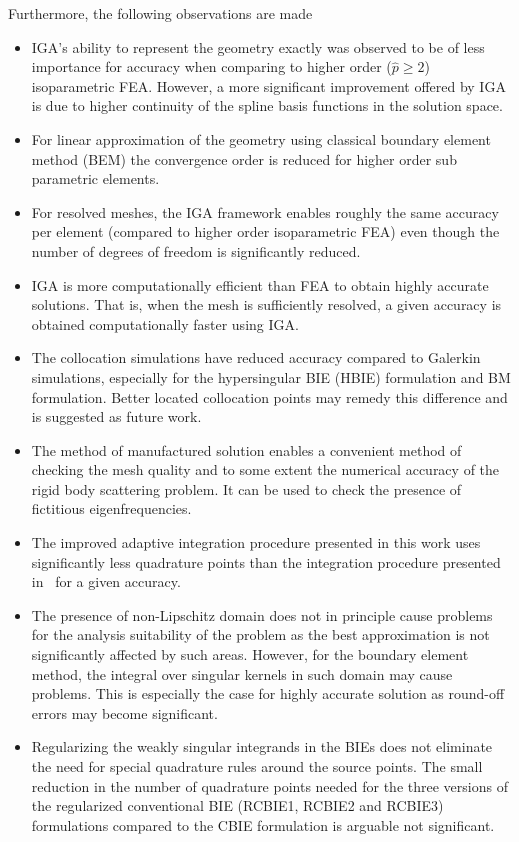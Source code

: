 Furthermore, the following observations are made
\begin{itemize}
	\item IGA's ability to represent the geometry exactly was observed to be of less importance for accuracy when comparing to higher order ($\hat{p}\geq 2$) isoparametric FEA. However, a more significant improvement offered by IGA is due to higher continuity of the spline basis functions in the solution space.
	\item For linear approximation of the geometry using classical boundary element method (BEM) the convergence order is reduced for higher order sub parametric elements.
	\item For resolved meshes, the IGA framework enables roughly the same accuracy per element (compared to higher order isoparametric FEA) even though the number of degrees of freedom is significantly reduced.
	\item IGA is more computationally efficient than FEA to obtain highly accurate solutions. That is, when the mesh is sufficiently resolved, a given accuracy is obtained computationally faster using IGA.
	\item The collocation simulations have reduced accuracy compared to Galerkin simulations, especially for the hypersingular BIE (HBIE) formulation and BM formulation. Better located collocation points may remedy this difference and is suggested as future work.
	\item The method of manufactured solution enables a convenient method of checking the mesh quality and to some extent the numerical accuracy of the rigid body scattering problem. It can be used to check the presence of fictitious eigenfrequencies.
	\item The improved adaptive integration procedure presented in this work uses significantly less quadrature points than the integration procedure presented in~\cite{Simpson2014aib} for a given accuracy.
	\item The presence of non-Lipschitz domain does not in principle cause problems for the analysis suitability of the problem as the best approximation is not significantly affected by such areas. However, for the boundary element method, the integral over singular kernels in such domain may cause problems. This is especially the case for highly accurate solution as round-off errors may become significant.
	\item Regularizing the weakly singular integrands in the BIEs does not eliminate the need for special quadrature rules around the source points. The small reduction in the number of quadrature points needed for the three versions of the regularized conventional BIE (RCBIE1, RCBIE2 and RCBIE3) formulations compared to the CBIE formulation is arguable not significant.

\end{itemize}
